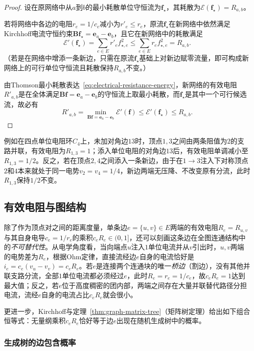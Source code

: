 \begin{proof}
设在原网络中从$a$到$b$的最小耗散单位守恒流为$\bm f_\star$，其耗散为$\mathcal E(\bm f_\star) = R_{a,b}$。

若将网络中各边的电阻$r_e = 1/c_e$减小为$r'_e \leq r_e$，原流$\bm f_\star$在新网络中依然满足Kirchhoff电流守恒约束$\bm B\bm f_\star = \bm e_a - \bm e_b$，且它在新网络中的耗散满足
\[
  \mathcal E'(\bm f_\star) = \sum_{e\in E} r'_e f_{\star,e}^2 \leq \sum_{e\in E} r_e f_{\star,e}^2 = R_{a,b}.
\]
（若是在网络中增添一条新边，只需在原流$\bm f_\star$基础上对新边赋零流量，即可构成新网络上的可行单位守恒流且耗散保持$R_{a,b}$不变。）

由Thomson最小耗散表达~\eqref{eq:electrical-resistance-energy}，新网络的有效电阻$R'_{a,b}$是在全体满足$\bm B\bm f = \bm e_a - \bm e_b$的守恒流上取最小耗散，而$\bm f_\star$是其中一个可行候选流，故必有
\[
  R'_{a,b} = \min_{\bm B\bm f = \bm e_a - \bm e_b}\mathcal E'(\bm f) \leq \mathcal E'(\bm f_\star) \leq R_{a,b}.
\]
\end{proof}

例如在四点单位电阻环$C_4$上，未加对角边$13$时，顶点$1,3$之间由两条阻值为$2$的支路并联，有效电阻为$R_{1,3} = 1$；添入单位电阻的对角边$13$后，有效电阻单调减小至$R_{1,3} = 1/2$。反之，若在顶点$2,4$之间添入一条新边，由于在$1\to 3$注入下对称顶点$2$和$4$本来就处于同一电势$v_2 = v_4 = 1/4$，新边两端无压降、不改变原有分流，此时$R_{1,3}$保持$1/2$不变。

\subsection{有效电阻与图结构}
\label{sec:graph-sparsification-resistance-trees}

除了作为顶点对之间的距离度量，单条边$e=\{u,v\}\in E$两端的有效电阻$R_e=R_{u,v}$与其自身电导$c_e=1/r_e$的乘积$c_e R_e\in(0,1]$，还可以刻画这条边在全图连通结构中的\emph{不可替代性}。从电学角度看，当向端点$u$注入$1$单位电流并从$v$引出时，$u,v$两端的电势差为$R_e$，根据Ohm定律，直接流经边$e$自身的电流恰好是$i_e = c_e(v_u-v_v) = c_e R_e$。若$e$是连接两个连通块的唯一\emph{桥边}（割边），没有其他并联支路分流，全部$1$单位电流都必须经过$e$，此时$R_e = r_e = 1/c_e$，故$c_e R_e = 1$达到最大值；反之，若$e$位于高度稠密的团内部，两端之间存在大量并联替代路径分担电流，流经$e$自身的电流占比$c_e R_e$就会很小。

更进一步，Kirchhoff与定理~\ref{thm:graph-matrix-tree}（矩阵树定理）给出如下组合恒等式：无量纲乘积$c_e R_e$恰好等于边$e$出现在随机生成树中的概率。

\subsubsection{生成树的边包含概率}
\label{sec:graph-tree-edge-probability}

